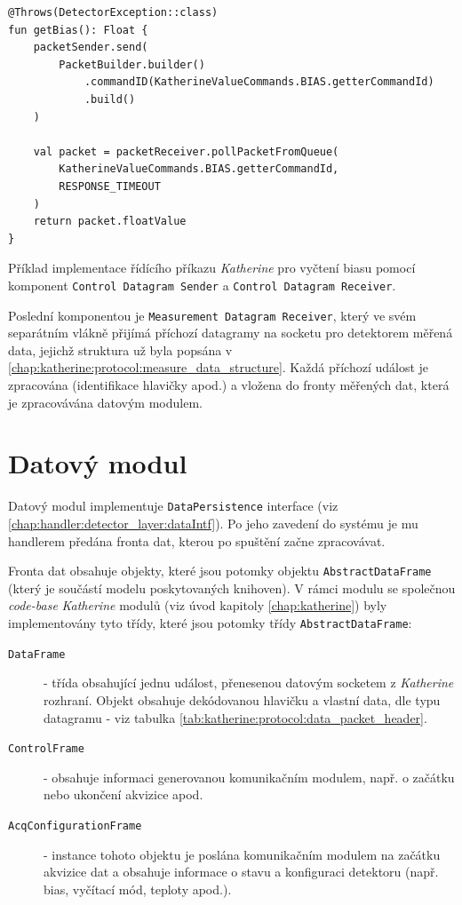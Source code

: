 \begin{code}[h]
    \begin{verbatim}
@Throws(DetectorException::class)
fun getBias(): Float {
    packetSender.send(
        PacketBuilder.builder()
            .commandID(KatherineValueCommands.BIAS.getterCommandId)
            .build()
    )

    val packet = packetReceiver.pollPacketFromQueue(
        KatherineValueCommands.BIAS.getterCommandId,
        RESPONSE_TIMEOUT
    )
    return packet.floatValue
}
    \end{verbatim}
    \caption{Příklad implementace řídícího příkazu \textit{Katherine} pro vyčtení biasu pomocí komponent \texttt{Control Datagram Sender} a \texttt{Control Datagram Receiver}.}
    \label{src:katherine:comm:example_get_bias}
\end{code}

Poslední komponentou je \texttt{Measurement Datagram Receiver}, který ve svém separátním vlákně přijímá příchozí datagramy na socketu pro detektorem měřená data, jejichž struktura už byla popsána v \ref{chap:katherine:protocol:measure_data_structure}. Každá příchozí událost je zpracována (identifikace hlavičky apod.) a vložena do fronty měřených dat, která je zpracovávána datovým modulem.

\section{Datový modul}\label{chap:katherine:data}
Datový modul implementuje \texttt{DataPersistence} interface (viz \ref{chap:handler:detector_layer:dataIntf}). Po jeho zavedení do systému je mu handlerem předána fronta dat, kterou po spuštění začne zpracovávat.

Fronta dat obsahuje objekty, které jsou potomky objektu \texttt{AbstractDataFrame} (který je součástí modelu poskytovaných knihoven). V rámci modulu se společnou \textit{code-base} \textit{Katherine} modulů (viz úvod kapitoly \ref{chap:katherine}) byly implementovány tyto třídy, které jsou potomky třídy \texttt{AbstractDataFrame}:
\begin{description}
    \item[\texttt{DataFrame}] - třída obsahující jednu událost, přenesenou datovým socketem z \textit{Katherine} rozhraní. Objekt obsahuje dekódovanou hlavičku a vlastní data, dle typu datagramu - viz tabulka \ref{tab:katherine:protocol:data_packet_header}.
    \item[\texttt{ControlFrame}] - obsahuje informaci generovanou komunikačním modulem, např. o začátku nebo ukončení akvizice apod.
    \item[\texttt{AcqConfigurationFrame}] - instance tohoto objektu je poslána komunikačním modulem na začátku akvizice dat a obsahuje informace o stavu a konfiguraci detektoru (např. bias, vyčítací mód, teploty apod.).
\end{description}  


